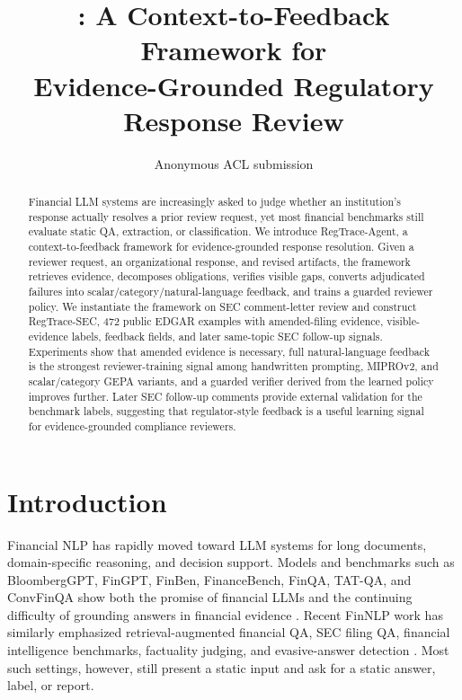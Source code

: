\documentclass[11pt]{article}
\title{\framework{}: A Context-to-Feedback Framework for\\
Evidence-Grounded Regulatory Response Review}
\author{Anonymous ACL submission}
\newcommand{\task}{evidence-grounded response resolution}
\newcommand{\dataset}{RegTrace-SEC}
\newcommand{\framework}{RegTrace-Agent}
\begin{document}
\maketitle
\begin{abstract}
Financial LLM systems are increasingly asked to judge whether an institution's response actually resolves a prior review request, yet most financial benchmarks still evaluate static QA, extraction, or classification. We introduce \framework{}, a context-to-feedback framework for \task{}. Given a reviewer request, an organizational response, and revised artifacts, the framework retrieves evidence, decomposes obligations, verifies visible gaps, converts adjudicated failures into scalar/category/natural-language feedback, and trains a guarded reviewer policy. We instantiate the framework on SEC comment-letter review and construct \dataset{}, 472 public EDGAR examples with amended-filing evidence, visible-evidence labels, feedback fields, and later same-topic SEC follow-up signals. Experiments show that amended evidence is necessary, full natural-language feedback is the strongest reviewer-training signal among handwritten prompting, MIPROv2, and scalar/category GEPA variants, and a guarded verifier derived from the learned policy improves further. Later SEC follow-up comments provide external validation for the benchmark labels, suggesting that regulator-style feedback is a useful learning signal for evidence-grounded compliance reviewers.
\end{abstract}

\section{Introduction}

Financial NLP has rapidly moved toward LLM systems for long documents, domain-specific reasoning, and decision support. Models and benchmarks such as BloombergGPT, FinGPT, FinBen, FinanceBench, FinQA, TAT-QA, and ConvFinQA show both the promise of financial LLMs and the continuing difficulty of grounding answers in financial evidence \citep{wu2023bloomberggpt,yang2023fingpt,xie2024finben,islam2023financebench,chen2021finqa,zhu2021tatqa,chen2022convfinqa}. Recent FinNLP work has similarly emphasized retrieval-augmented financial QA, SEC filing QA, financial intelligence benchmarks, factuality judging, and evasive-answer detection \citep{lithgow2025rag,lai2025secqa,klimaszewski2025avenibench,wu2025nli,nuaimi2025evasive}. Most such settings, however, still present a static input and ask for a static answer, label, or report.
\end{document}
